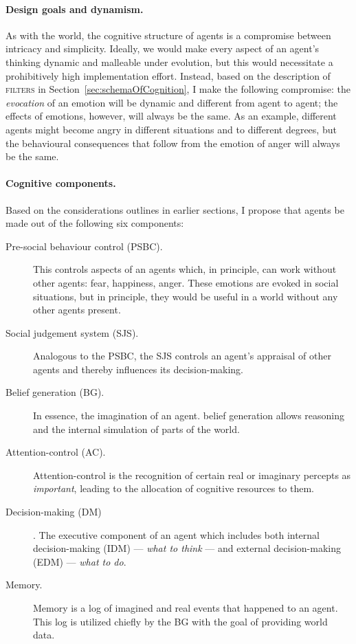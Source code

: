 \paragraph{Design goals and dynamism.} As with the world, the cognitive structure of agents is a compromise between intricacy and simplicity. Ideally, we would make every aspect of an agent's thinking dynamic and malleable under evolution, but this would necessitate a prohibitively high implementation effort. Instead, based on the description of \textsc{filters} in Section~\ref{sec:schemaOfCognition}, I make the following compromise: the {\em evocation} of an emotion will be dynamic and different from agent to agent; the effects of emotions, however, will always be the same. As an example, different agents might become angry in different situations and to different degrees, but the behavioural consequences that follow from the emotion of anger will always be the same.

\paragraph{Cognitive components.} Based on the considerations outlines in earlier sections, I propose that agents be made out of the following six components:

\begin{description}
	\item[Pre-social behaviour control (PSBC).] This controls aspects of an agents which, in principle, can work without other agents: fear, happiness, anger.  These emotions are evoked in social situations, but in principle, they would be useful in a world without any other agents present.
	\item[Social judgement system (SJS).] Analogous to the \textsc{PSBC}, the \textsc{SJS} controls an agent's appraisal of other agents and thereby influences its decision-making.
	\item[Belief generation (BG).] In essence, the imagination of an agent. belief generation allows reasoning and the internal simulation of parts of the world.
	\item[Attention-control (AC).] Attention-control is the recognition of certain real or imaginary percepts as {\em important}, leading to the allocation of cognitive resources to them.
	\item[Decision-making (DM)]. The executive component of an agent which includes both internal decision-making (IDM) --- {\em what to think} --- and external decision-making (EDM) --- {\em what to do}.
	\item[Memory.] Memory is a log of imagined and real events that happened to an agent. This log is utilized chiefly by the \textsc{BG} with the goal of providing world data.
\end{description}

